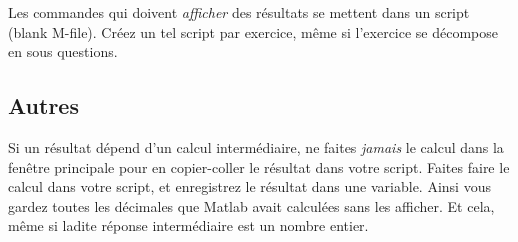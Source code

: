 Les commandes qui doivent \emph{afficher} des résultats se mettent dans un script (blank M-file). Créez un tel script par exercice, même si l'exercice se décompose en sous questions.

\subsection{Autres}

Si un résultat dépend d'un calcul intermédiaire, ne faites \emph{jamais} le calcul dans la fenêtre principale pour en copier-coller le résultat dans votre script. Faites faire le calcul dans votre script, et enregistrez le résultat dans une variable. Ainsi vous gardez toutes les décimales que Matlab avait calculées sans les afficher. Et cela, même si ladite réponse intermédiaire est un nombre entier.


